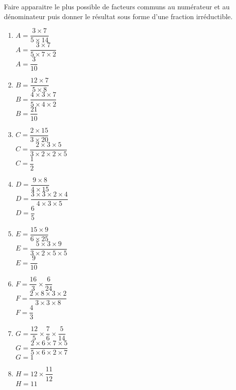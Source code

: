 \begin{corrige}
    Faire apparaitre le plus possible de facteurs communs au numérateur et au dénominateur puis donner le résultat sous forme d'une fraction irréductible.
    \begin{multicols}{2}
        \begin{spacing}{2}
            \begin{enumerate}
                \item $A=\dfrac{3\times 7}{5\times 14}$\\
                {\red $A=\dfrac{3\times 7}{5\times 7\times 2}$\\$A=\dfrac{3}{10}$}
                \item $B=\dfrac{12\times 7}{5\times 8}$\\
                {\red $B=\dfrac{4\times 3\times 7}{5\times 4\times 2}$\\$B=\dfrac{21}{10}$}
                \item $C=\dfrac{2\times 15}{3\times 20}$\\
                {\red $C=\dfrac{2\times 3\times 5}{3\times 2\times 2\times 5}$\\$C=\dfrac{1}{2}$}
                \item $D=\dfrac{9\times 8}{4\times 15}$\\
                {\red $D=\dfrac{3\times 3\times 2\times 4}{4\times 3\times 5}$\\$D=\dfrac{6}{5}$}
                \columnbreak
                \item $E=\dfrac{15\times 9}{6\times 25}$\\
                {\red $E=\dfrac{5\times 3\times 9}{3\times 2\times 5\times 5}$\\$E=\dfrac{9}{10}$}
                \item $F=\dfrac{16}{3}\times\dfrac{6}{24}$\\
                {\red $F=\dfrac{2\times 8\times 3\times 2}{3\times 3\times 8}$\\$F=\dfrac{4}{3}$}
                \item $G=\dfrac{12}{5}\times\dfrac{7}{6}\times\dfrac{5}{14}$\\
                {\red $G=\dfrac{2\times 6\times 7\times 5}{5\times 6\times 2\times 7}$\\$G=1$}
                \item $H=12\times\dfrac{11}{12}$\\
                {\red $H=11$}
            \end{enumerate}
        \end{spacing}
    \end{multicols}
\end{corrige}

